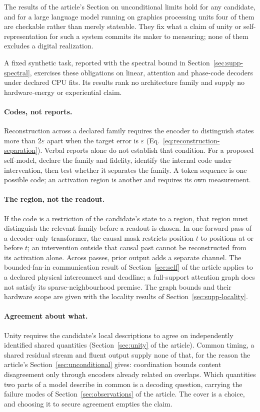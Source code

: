 \documentclass{article}
\begin{document}
The results of the article's Section on unconditional limits hold for any candidate, and for a large language model running on graphics processing units four of them are checkable rather than merely stateable. They fix what a claim of unity or self-representation for such a system commits its maker to measuring; none of them excludes a digital realization.

A fixed synthetic task, reported with the spectral bound in Section~\ref{sec:supp-spectral}, exercises these obligations on linear, attention and phase-code decoders under declared CPU fits. Its results rank no architecture family and supply no hardware-energy or experiential claim.

\paragraph{Codes, not reports.} Reconstruction across a declared family requires the encoder to distinguish states more than $2\varepsilon$ apart when the target error is $\varepsilon$ (Eq.~\eqref{eq:reconstruction-separation}). Verbal reports alone do not establish that condition. For a proposed self-model, declare the family and fidelity, identify the internal code under intervention, then test whether it separates the family. A token sequence is one possible code; an activation region is another and requires its own measurement.

\paragraph{The region, not the readout.} If the code is a restriction of the candidate's state to a region, that region must distinguish the relevant family before a readout is chosen. In one forward pass of a decoder-only transformer, the causal mask restricts position $t$ to positions at or before $t$; an intervention outside that causal past cannot be reconstructed from its activation alone. Across passes, prior output adds a separate channel. The bounded-fan-in communication result of Section~\ref{sec:self} of the article applies to a declared physical interconnect and deadline; a full-support attention graph does not satisfy its sparse-neighbourhood premise. The graph bounds and their hardware scope are given with the locality results of Section~\ref{sec:supp-locality}.

\paragraph{Agreement about what.} Unity requires the candidate's local descriptions to agree on independently identified shared quantities (Section~\ref{sec:unity} of the article). Common timing, a shared residual stream and fluent output supply none of that, for the reason the article's Section~\ref{sec:unconditional} gives: coordination bounds content disagreement only through encoders already related on overlaps. Which quantities two parts of a model describe in common is a decoding question, carrying the failure modes of Section~\ref{sec:observations} of the article. The cover is a choice, and choosing it to secure agreement empties the claim.
\end{document}
